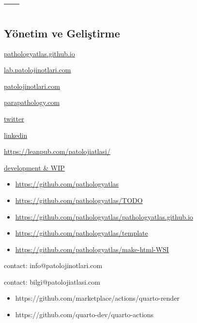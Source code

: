 \documentclass[
  letterpaper,
  DIV=11,
  numbers=noendperiod]{scrreprt}
\newlength{\cslhangindent}
\newlength{\cslentryspacingunit} %
\newenvironment{CSLReferences}[2] %
 {%
  \setlength{\parindent}{0pt}
  \ifodd #1
  \let\oldpar\par
  \def\par{\hangindent=\cslhangindent\oldpar}
  \fi
  \setlength{\parskip}{#2\cslentryspacingunit}
 }%
 {}
\begin{document}
\hypertarget{refs}{}
\begin{CSLReferences}{0}{0}
\end{CSLReferences}

\part{---}

\appendix
{}

\hypertarget{yuxf6netim-ve-geliux15ftirme}{%
\chapter{Yönetim ve Geliştirme}\label{yuxf6netim-ve-geliux15ftirme}}

\href{https://www.patoloji.dev/}{pathologyatlas.github.io}

\href{https://lab.patolojinotlari.com}{lab.patolojinotlari.com}

\href{https://patolojinotlari.com}{patolojinotlari.com}

\href{https://parapathology.com}{parapathology.com}

\href{https://twitter.com/patolojinotlari}{twitter}

\href{https://www.linkedin.com/company/patoloji-notlari}{linkedin}

\url{https://leanpub.com/patolojiatlasi/}

\href{https://www.patoloji.dev/development.md}{development \&
WIP}

\begin{itemize}
\item
  \url{https://github.com/pathologyatlas}
\item
  \url{https://github.com/pathologyatlas/TODO}
\item
  \url{https://github.com/pathologyatlas/pathologyatlas.github.io}
\item
  \url{https://github.com/pathologyatlas/template}
\item
  \url{https://github.com/pathologyatlas/make-html-WSI}
\end{itemize}

contact: info@patolojinotlari.com

contact: bilgi@patolojiatlasi.com

\begin{itemize}
\item
  https://github.com/marketplace/actions/quarto-render
\item
  https://github.com/quarto-dev/quarto-actions
\end{itemize}
\end{document}
